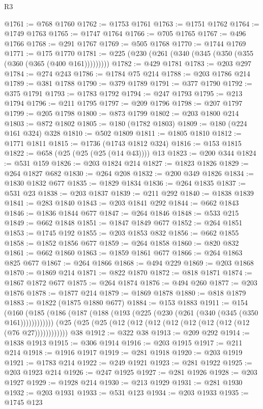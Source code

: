 \begin{lexlean}{R3}
\begin{coremodule}
@1761 := @768 @1760
@1762 := @1753 @1761
@1763 := @1751 @1762
@1764 := @1749 @1763
@1765 := @1747 @1764
@1766 := @705 @1765
@1767 := @496 @1766
@1768 := @291 @1767
@1769 := @505 @1768
@1770 := @1744 @1769
@1771 := @175 @1770
@1781 := @225 (@230 (@261 (@340 (@345 (@350 (@355 (@360 (@365 (@400 @161)))))))))
@1782 := @429 @1781
@1783 := @203 @297
@1784 := @274 @243
@1786 := @1784 @75 @214
@1788 := @203 @1786 @214
@1789 := @381 @1788
@1790 := @379 @1789
@1791 := @377 @1790
@1792 := @375 @1791
@1793 := @1783 @1792
@1794 := @247 @1793
@1795 := @213 @1794
@1796 := @211 @1795
@1797 := @209 @1796
@1798 := @207 @1797
@1799 := @205 @1798
@1800 := @873 @1799
@1802 := @203 @1800 @214
@1803 := @872 @1802
@1805 := @180 (@1782 @1803)
@1809 := @180 (@224 @161 @324) @328
@1810 := @502 @1809
@1811 := @1805 @1810
@1812 := @1771 @1811
@1815 := @1736 (@1743 @1812 @324)
@1816 := @153 @1815
@1822 := @658 (@25 (@25 (@25 (@14 @43)))) @13
@1823 := @200 @344
@1824 := @531 @159
@1826 := @203 @1824 @214
@1827 := @1823 @1826
@1829 := @264 @1827 @682
@1830 := @264 @208
@1832 := @200 @349 @1826
@1834 := @1830 @1832 @677
@1835 := @1829 @1834
@1836 := @264 @1835
@1837 := @531 @23
@1838 := @203 @1837
@1839 := @211 @292
@1840 := @1838 @1839
@1841 := @283 @1840
@1843 := @203 @1841 @292
@1844 := @662 @1843
@1846 := @1836 @1844 @677
@1847 := @264 @1846
@1848 := @533 @215
@1849 := @662 @1848
@1851 := @1847 @1849 @677
@1852 := @264 @1851
@1853 := @1745 @192
@1855 := @203 @1853 @832
@1856 := @662 @1855
@1858 := @1852 @1856 @677
@1859 := @264 @1858
@1860 := @820 @832
@1861 := @662 @1860
@1863 := @1859 @1861 @677
@1866 := @264 @1863 @825 @677
@1867 := @264 @1866
@1868 := @494 @229
@1869 := @203 @1868
@1870 := @1869 @214
@1871 := @822 @1870
@1872 := @818 @1871
@1874 := @1867 @1872 @677
@1875 := @264 @1874
@1876 := @494 @260
@1877 := @203 @1876
@1878 := @1877 @214
@1879 := @1869 @1878
@1880 := @818 @1879
@1883 := @1822 (@1875 @1880 @677)
@1884 := @153 @1883
@1911 := @154
    (@160 (@185 (@186 (@187 (@188 (@193 (@225 (@230 (@261 (@340 (@345 (@350 @161))))))))))))
    (@25 (@25 (@25 (@12 (@12 (@12 (@12 (@12 (@12 (@12 (@12 (@76 @27))))))))))))
    @38
@1912 := @322 @38
@1913 := @209 @292
@1914 := @1838 @1913
@1915 := @306 @1914
@1916 := @203 @1915
@1917 := @211 @214
@1918 := @1916 @1917
@1919 := @281 @1918
@1920 := @203 @1919
@1921 := @1783 @214
@1922 := @249 @1921
@1923 := @281 @1922
@1925 := @203 @1923 @214
@1926 := @247 @1925
@1927 := @281 @1926
@1928 := @203 @1927
@1929 := @1928 @214
@1930 := @213 @1929
@1931 := @281 @1930
@1932 := @203 @1931
@1933 := @531 @123
@1934 := @203 @1933
@1935 := @1745 @123

\end{coremodule}
\end{lexlean}
